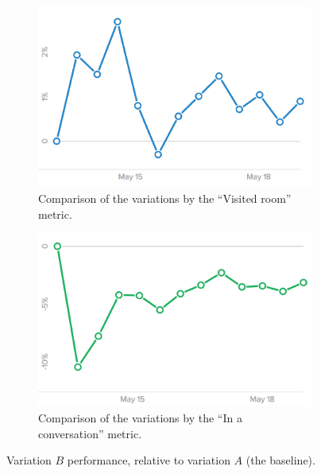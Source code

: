 \begin{figure}[h]
  \centering
  \begin{subfigure}[t]{0.8\textwidth}
    \includegraphics[width=\textwidth]{Figures/plots/ab-frontpage/room-conversions-plot-only}
    \caption{Comparison of the variations by the ``Visited room'' metric.}
    \label{fig:performance_room}
  \end{subfigure}

  \vspace{1em}

  \begin{subfigure}[t]{0.8\textwidth}
    \includegraphics[width=\textwidth]{Figures/plots/ab-frontpage/conversation-conversions-plot-only}
    \caption{Comparison of the variations by the ``In a conversation'' metric.}
    \label{fig:performance_conversation}
  \end{subfigure}

  \caption{Variation $B$ performance, relative to variation $A$ (the baseline).}
  \label{fig:ab_performance_plots}
\end{figure}

